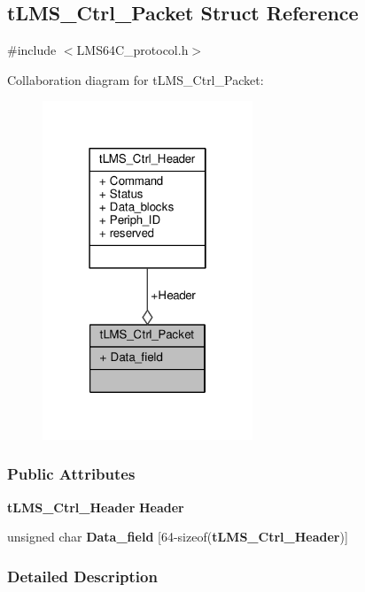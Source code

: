 \subsection{t\+L\+M\+S\+\_\+\+Ctrl\+\_\+\+Packet Struct Reference}
\label{structtLMS__Ctrl__Packet}


{\ttfamily \#include $<$L\+M\+S64\+C\+\_\+protocol.\+h$>$}



Collaboration diagram for t\+L\+M\+S\+\_\+\+Ctrl\+\_\+\+Packet\+:\nopagebreak
\begin{figure}[H]
\begin{center}
\leavevmode
\includegraphics[width=178pt]{d5/d05/structtLMS__Ctrl__Packet__coll__graph}
\end{center}
\end{figure}
\subsubsection*{Public Attributes}
\begin{DoxyCompactItemize}
\item 
{\bf t\+L\+M\+S\+\_\+\+Ctrl\+\_\+\+Header} {\bf Header}
\item 
unsigned char {\bf Data\+\_\+field} [64-\/sizeof({\bf t\+L\+M\+S\+\_\+\+Ctrl\+\_\+\+Header})]
\end{DoxyCompactItemize}


\subsubsection{Detailed Description}


